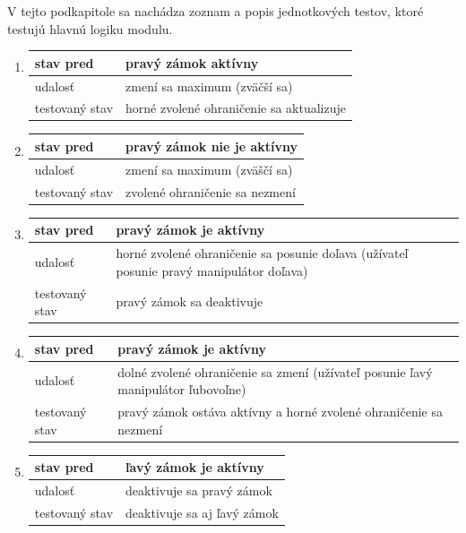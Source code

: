 \documentclass[
  digital, %
  twoside, %
  notable,   %
  nolof,   %
  nolot,   %
]{fithesis3}
\begin{document}
V tejto podkapitole sa nachádza zoznam a popis jednotkových testov, ktoré testujú hlavnú logiku modulu.
\begin{enumerate}
  \item
  \begin{tabular}{ | p{2.75cm} | p{8cm} | }
    \hline
    stav pred & pravý zámok aktívny \\ \hline
    udalosť & zmení sa maximum (zväčší sa)\\ \hline
    testovaný stav & horné zvolené ohraničenie sa aktualizuje \\ \hline
  \end{tabular}

  \item
  \begin{tabular}{ | p{2.75cm} | p{8cm} | }
    \hline
    stav pred & pravý zámok nie je aktívny \\ \hline
    udalosť & zmení sa maximum (zväščí sa)\\ \hline
    testovaný stav & zvolené ohraničenie sa nezmení \\ \hline
  \end{tabular}

  \item
  \begin{tabular}{ | p{2.75cm} | p{8cm} | }
    \hline
    stav pred & pravý zámok je aktívny \\ \hline
    udalosť & horné zvolené ohraničenie sa posunie doľava (užívateľ posunie pravý manipulátor doľava)\\ \hline
    testovaný stav & pravý zámok sa deaktivuje \\ \hline
  \end{tabular}

  \item
  \begin{tabular}{ | p{2.75cm} | p{8cm} | }
    \hline
    stav pred & pravý zámok je aktívny \\ \hline
    udalosť & dolné zvolené ohraničenie sa zmení (užívateľ posunie ľavý manipulátor ľubovoľne)\\ \hline
    testovaný stav & pravý zámok ostáva aktívny a horné zvolené ohraničenie sa nezmení \\ \hline
  \end{tabular}

  \item
  \begin{tabular}{ | p{2.75cm} | p{8cm} | }
    \hline
    stav pred & ľavý zámok je aktívny \\ \hline
    udalosť & deaktivuje sa pravý zámok \\ \hline
    testovaný stav & deaktivuje sa aj ľavý zámok \\ \hline
  \end{tabular}


\end{enumerate}
\end{document}
